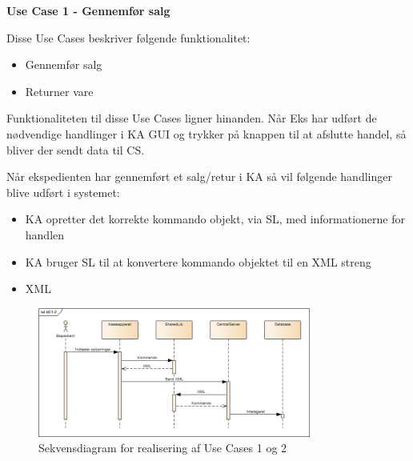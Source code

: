 \textbf{Use Case 1 - Gennemfør salg}

Disse Use Cases beskriver følgende funktionalitet:
\begin{itemize}
	\item Gennemfør salg
	\item Returner vare
\end{itemize}
Funktionaliteten til disse Use Cases ligner hinanden. Når \gls{Eks} har udført de nødvendige
handlinger i \gls{KA} \gls{GUI} og trykker på knappen til at afslutte handel, så bliver der sendt data til \gls{CS}.

Når ekspedienten har gennemført et salg/retur i \gls{KA} så vil følgende
handlinger blive udført i systemet:
\begin{itemize}
	\item \gls{KA} opretter det korrekte kommando objekt, via \gls{SL}, med informationerne for handlen
	\item \gls{KA} bruger \gls{SL} til at konvertere kommando objektet til en XML streng
	\item XML 
\end{itemize}

\begin{figure}[H]
	\centering
	\includegraphics[width=0.8\textwidth]{Systemarkitektur/LogiskView/Realiseringer/Images/UC12.png}
	\caption{Sekvensdiagram for realisering af Use Cases 1 og 2}
	\label{fig:uc38sq}
\end{figure}

